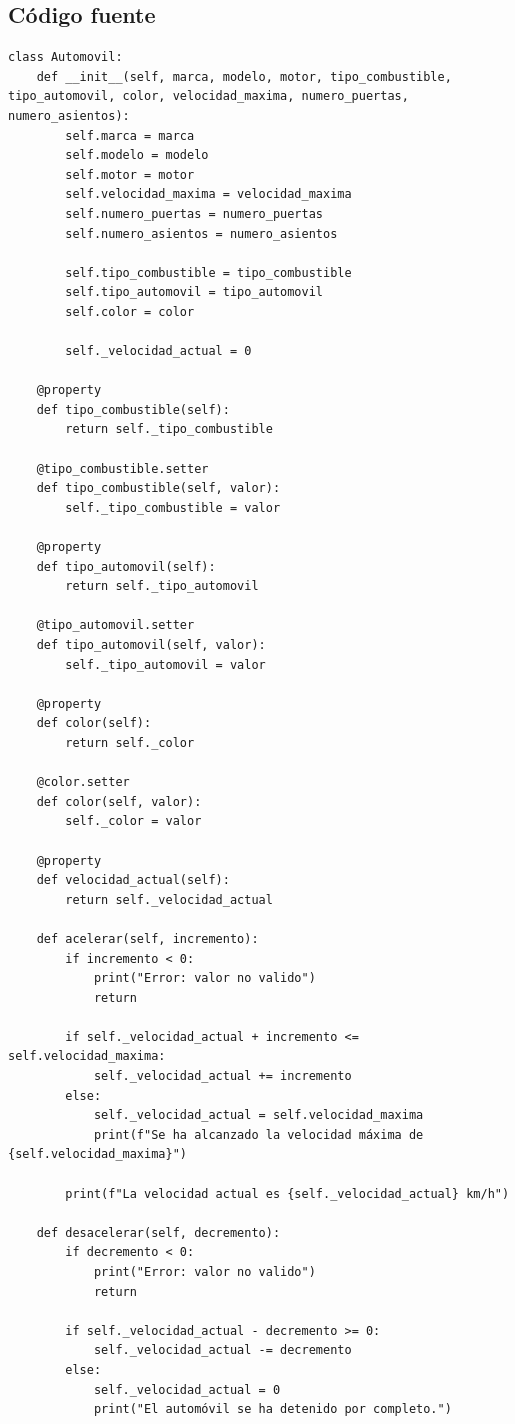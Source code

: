 \documentclass[11pt, a4paper]{article}
\begin{document}
\subsection{Código fuente}
\begin{lstlisting}
class Automovil:
    def __init__(self, marca, modelo, motor, tipo_combustible, tipo_automovil, color, velocidad_maxima, numero_puertas, numero_asientos):
        self.marca = marca
        self.modelo = modelo
        self.motor = motor
        self.velocidad_maxima = velocidad_maxima
        self.numero_puertas = numero_puertas
        self.numero_asientos = numero_asientos

        self.tipo_combustible = tipo_combustible
        self.tipo_automovil = tipo_automovil
        self.color = color

        self._velocidad_actual = 0

    @property
    def tipo_combustible(self):
        return self._tipo_combustible

    @tipo_combustible.setter
    def tipo_combustible(self, valor):
        self._tipo_combustible = valor

    @property
    def tipo_automovil(self):
        return self._tipo_automovil

    @tipo_automovil.setter
    def tipo_automovil(self, valor):
        self._tipo_automovil = valor

    @property
    def color(self):
        return self._color

    @color.setter
    def color(self, valor):
        self._color = valor

    @property
    def velocidad_actual(self):
        return self._velocidad_actual

    def acelerar(self, incremento):
        if incremento < 0:
            print("Error: valor no valido")
            return

        if self._velocidad_actual + incremento <= self.velocidad_maxima:
            self._velocidad_actual += incremento
        else:
            self._velocidad_actual = self.velocidad_maxima
            print(f"Se ha alcanzado la velocidad máxima de {self.velocidad_maxima}")

        print(f"La velocidad actual es {self._velocidad_actual} km/h")

    def desacelerar(self, decremento):
        if decremento < 0:
            print("Error: valor no valido")
            return

        if self._velocidad_actual - decremento >= 0:
            self._velocidad_actual -= decremento
        else:
            self._velocidad_actual = 0
            print("El automóvil se ha detenido por completo.")


\end{lstlisting}
\end{document}
